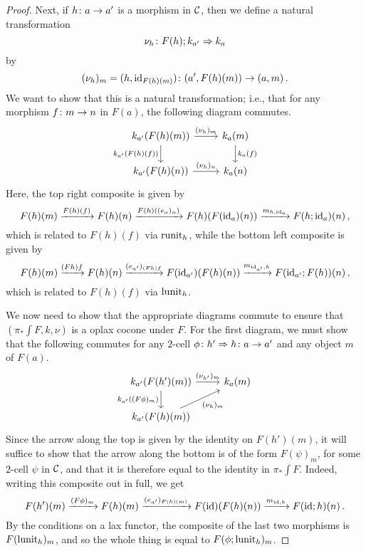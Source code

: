 \begin{proof}
  Next, if $h\colon a \to a'$ is a morphism in ${\mathcal{C}}$, then we define a natural transformation
  \[
    \nu_h \colon F(h);k_{a'} \Rightarrow k_a
    \]
  by
  \[
    (\nu_h)_m = (h, \operatorname{id}_{F(h)(m)}) \colon (a',F(h)(m)) \to (a,m)\,.
    \]
  We want to show that this is a natural transformation; i.e., that for any morphism $f \colon m \to n$ in $F(a)$, the following diagram commutes.
  \[
    \begin{tikzcd}
      k_{a'}(F(h)(m)) \arrow[r, "(\nu_h)_m"] \arrow[d, "k_{a'}(F(h)(f))"']
        & k_a(m) \arrow[d, "k_a(f)"] \\
      k_{a'}(F(h)(n)) \arrow[r, "(\nu_h)_n"]
        & k_a(n)
    \end{tikzcd}
    \]
  Here, the top right composite is given by
  \[
    F(h)(m) \xrightarrow{F(h)(f)}
    F(h)(n) \xrightarrow{F(h)((e_{a})_n)}
    F(h)(F(\operatorname{id}_a)(n)) \xrightarrow{m_{h,\operatorname{id}_a}}
    F(h;\operatorname{id}_a)(n)\,,
    \]
  which is related to $F(h)(f)$ via $\operatorname{runit}_h$, while the bottom left composite is given by
  \[
    F(h)(m) \xrightarrow{\ms\ms(Fh)f\ms\ms}
    F(h)(n) \xrightarrow{\ms\ms(e_{a'})_{(Fh)f}\ms\ms}
    F(\id_{a'})(F(h)(n)) \xrightarrow{\ms\ms m_{\id_{a'},h}\ms\ms}
    F(\id_{a'};F(h))(n)\,,
    \]
  which is related to $F(h)(f)$ via $\operatorname{lunit}_h$.

  We now need to show that the appropriate diagrams commute to ensure that $\left(\pi_*\int F,k,\nu\right)$ is a oplax cocone under $F$.
  For the first diagram, we must show that the following commutes for any $2$-cell $\phi\colon h' \Rightarrow h\colon a \to a'$ and any object $m$ of $F(a)$.
  \[
    \begin{tikzcd}
      k_{a'}(F(h')(m)) \arrow[r, "(\nu_{h'})_m"] \arrow[d, "k_{a'}((F\phi)_m)"']
        & k_a(m) \\
      k_{a'}(F(h)(m)) \arrow[ur, "(\nu_h)_m"']
        &
    \end{tikzcd}
    \]
  Since the arrow along the top is given by the identity on $F(h')(m)$, it will suffice to show that the arrow along the bottom is of the form $F(\psi)_m$, for some $2$-cell $\psi$ in ${\mathcal{C}}$, and that it is therefore equal to the identity in $\pi_*\int F$.
  Indeed, writing this composite out in full, we get
  \[
    F(h')(m) \xrightarrow{(F\phi)_m}
    F(h)(m) \xrightarrow{(e_{a'})_{F(h)(m)}}
    F(\operatorname{id})(F(h)(n)) \xrightarrow{m_{\operatorname{id},h}}
    F(\operatorname{id};h)(n)\,.
    \]
  By the conditions on a lax functor, the composite of the last two morphisms is $F(\operatorname{lunit}_h)_m$, and so the whole thing is equal to $F(\phi;\operatorname{lunit}_h)_m$.


\end{proof}
